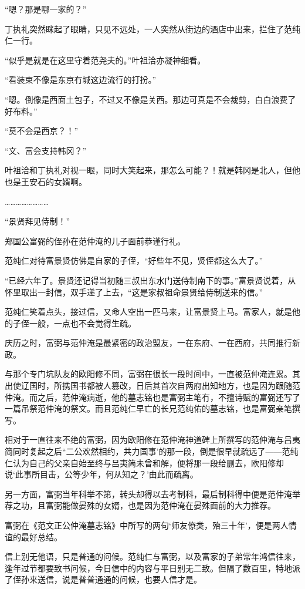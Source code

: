 “嗯？那是哪一家的？”

丁执礼突然眯起了眼睛，只见不远处，一人突然从街边的酒店中出来，拦住了范纯仁一行。

“似乎是就是在这里守着范尧夫的。”叶祖洽亦凝神细看。

“看装束不像是东京冇城这边流行的打扮。”

“嗯。倒像是西面土包子，不过又不像是关西。那边可真是不会裁剪，白白浪费了好布料。”

“莫不会是西京？！”

“文、富会支持韩冈？”

叶祖洽和丁执礼对视一眼，同时大笑起来，那怎么可能？！就是韩冈是北人，但他也是王安石的女婿啊。

……………………

“景贤拜见侍制！”

郑国公富弼的侄孙在范仲淹的儿子面前恭谨行礼。

范纯仁对待富景贤仿佛是自家的子侄，“好些年不见，贤侄都这么大了。”

“已经六年了。景贤还记得当初随三叔出东水门送侍制南下的事。”富景贤说着，从怀里取出一封信，双手递了上去，“这是家叔祖命景贤给侍制送来的信。”

范纯仁笑着点头，接过信，又命人空出一匹马来，让富景贤上马。富家人，就是他的子侄一般，一点也不会觉得生疏。

庆历之时，富弼与范仲淹是最紧密的政治盟友，一在东府、一在西府，共同推行新政。

与那个专门坑队友的欧阳修不同，富弼在很长一段时间中，一直被范仲淹连累。其出使辽国时，所携国书都被人篡改，日后其首次自两府出知地方，也是因为跟随范仲淹。而之后，范仲淹病逝，他的墓志铭也是富弼主笔冇，不擅诗赋的富弼还写了一篇吊祭范仲淹的祭文。而且范纯仁早亡的长兄范纯佑的墓志铭，也是富弼亲笔撰写。

相对于一直往来不绝的富弼，因为欧阳修在范仲淹神道碑上所撰写的范仲淹与吕夷简同时复起之后“二公欢然相约，共力国事’的那一段，倒是很早就疏远了——范纯仁认为自己的父亲自始至终与吕夷简未曾和解，便将那一段给删去，欧阳修却说‘此事所目击，公等少年，何从知之？’由此而疏离。

另一方面，富弼当年科举不第，转头却得以去考制科，最后制科得中便是范仲淹举荐之功，且富弼能做晏殊的女婿，也是因为范仲淹在晏殊面前的大力推荐。

富弼在《范文正公仲淹墓志铭》中所写的两句‘师友僚类，殆三十年’，便是两人情谊的最好总结。

信上别无他语，只是普通的问候。范纯仁与富弼，以及富家的子弟常年鸿信往来，逢年过节都要致书问候，今日信中的内容与平日别无二致。但隔了数百里，特地派了侄孙来送信，说是普普通通的问候，也要人信才是。

